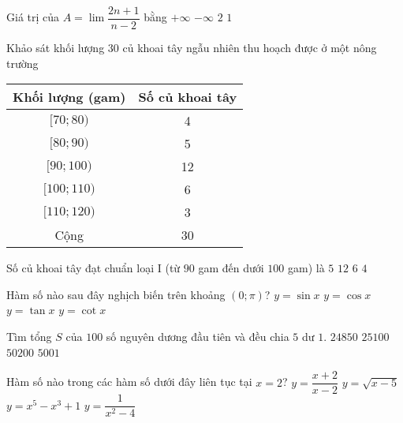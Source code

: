 \begin{ex}%
Giá trị của $A=\lim \dfrac{2n+1}{n-2}$ bằng
\choice
{$+\infty$}
{$-\infty$}
{\True $2$}
{$1$}
\end{ex}

\begin{ex}%
Khảo sát khối lượng $30$ củ khoai tây ngẫu nhiên thu hoạch được ở một nông trường
\begin{center}
\begin{tabular}{|c|c|}
\hline
Khối lượng (gam) & Số củ khoai tây \\
\hline
$[70{;}80)$ & 4 \\
$[80{;}90)$ & 5 \\
$[90{;}100)$ & 12 \\
$[100{;}110)$ & 6 \\
$[110{;}120)$ & 3 \\
\hline
Cộng & 30 \\
\hline
\end{tabular}
\end{center}
Số củ khoai tây đạt chuẩn loại I (từ $90$ gam đến dưới $100$ gam) là
\choice
{$5$}
{\True $12$}
{$6$}
{$4$}
\end{ex}

\begin{ex}%
Hàm số nào sau đây nghịch biến trên khoảng $\left(0;\pi \right)$?
\choice
{$y=\sin x$}
{\True $y=\cos x$}
{$y=\tan x$}
{$y=\cot x$}
\end{ex}

\begin{ex}%
Tìm tổng $S$ của $100$ số nguyên dương đầu tiên và đều chia $5$ dư $1$.
\choice
{\True $24850$ }
{ $25100$ }
{ $50200$ }
{ $5001$ }
\end{ex}

\begin{ex}%
Hàm số nào trong các hàm số dưới đây liên tục tại $x=2$?
\choice
{$y=\dfrac{x+2}{x-2}$}
{$y=\sqrt{x-5}$}
{\True $y=x^5-x^3+1$}
{$y=\dfrac{1}{x^2-4}$}
\end{ex}

